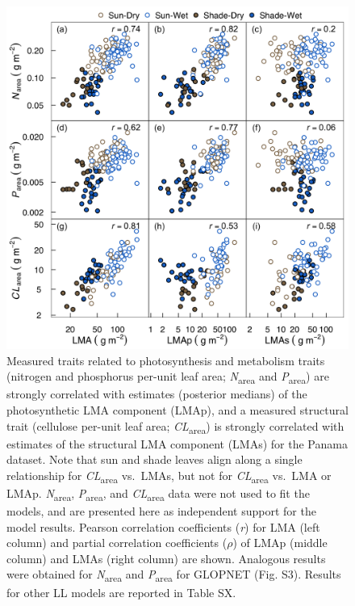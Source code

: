 \documentclass[
  12pt,
  a4paper,
,tablecaptionabove
]{scrartcl}
\providecommand{\DIFaddendFL}{} %
\DeclareRobustCommand{\DIFaddendFL}{\DIFOaddendFL \let\includegraphics\DIFOincludegraphics} %
\begin{document}
\begin{figure}
\hypertarget{fig:PA-NPC}{%
\centering
\includegraphics{../figs/PA_NPC.png}
\caption{Measured traits related to photosynthesis and metabolism traits (nitrogen and phosphorus per-unit leaf area; \emph{N}\textsubscript{area} and \emph{P}\textsubscript{area}) are strongly correlated with estimates (posterior medians) of the photosynthetic LMA component (LMAp), and a measured structural trait (cellulose per-unit leaf area; \emph{CL}\textsubscript{area}) is strongly correlated with estimates of the structural LMA component (LMAs) for the Panama dataset.
Note that sun and shade leaves align along a single relationship for \emph{CL}\textsubscript{area} vs.~LMAs, but not for \emph{CL}\textsubscript{area} vs.~LMA or LMAp. \emph{N}\textsubscript{area}, \emph{P}\textsubscript{area}, and \emph{CL}\textsubscript{area} data were not used to fit the models, and are presented here as independent support for the model results.
Pearson correlation coefficients (\emph{r}) for LMA (left column) and partial correlation coefficients (\(\rho\)) of LMAp (middle column) and LMAs (right column) are shown.
Analogous results were obtained for \emph{N}\textsubscript{area} and \emph{P}\textsubscript{area} for GLOPNET (Fig. S3).
Results for other LL models are reported in Table SX.}\label{fig:PA-NPC}
}
\DIFaddendFL \end{figure}
\end{document}
